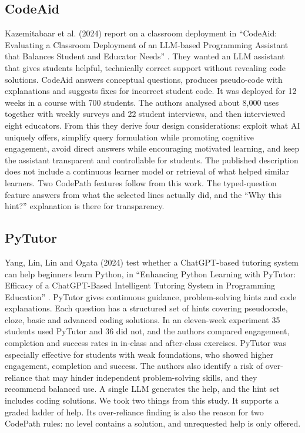 \clearpage
\subsection{CodeAid}
Kazemitabaar et al. (2024) report on a classroom deployment in ``CodeAid: Evaluating a Classroom Deployment of an LLM-based Programming Assistant that Balances Student and Educator Needs'' \cite{kazemitabaar2024}. They wanted an LLM assistant that gives students helpful, technically correct support without revealing code solutions. CodeAid answers conceptual questions, produces pseudo-code with explanations and suggests fixes for incorrect student code. It was deployed for 12 weeks in a course with 700 students. The authors analysed about 8,000 uses together with weekly surveys and 22 student interviews, and then interviewed eight educators. From this they derive four design considerations: exploit what AI uniquely offers, simplify query formulation while promoting cognitive engagement, avoid direct answers while encouraging motivated learning, and keep the assistant transparent and controllable for students. The published description does not include a continuous learner model or retrieval of what helped similar learners. Two CodePath features follow from this work. The typed-question feature answers from what the selected lines actually did, and the ``Why this hint?'' explanation is there for transparency.

\subsection{PyTutor}
Yang, Lin, Lin and Ogata (2024) test whether a ChatGPT-based tutoring system can help beginners learn Python, in ``Enhancing Python Learning with PyTutor: Efficacy of a ChatGPT-Based Intelligent Tutoring System in Programming Education'' \cite{yang2024}. PyTutor gives continuous guidance, problem-solving hints and code explanations. Each question has a structured set of hints covering pseudocode, cloze, basic and advanced coding solutions. In an eleven-week experiment 35 students used PyTutor and 36 did not, and the authors compared engagement, completion and success rates in in-class and after-class exercises. PyTutor was especially effective for students with weak foundations, who showed higher engagement, completion and success. The authors also identify a risk of over-reliance that may hinder independent problem-solving skills, and they recommend balanced use. A single LLM generates the help, and the hint set includes coding solutions. We took two things from this study. It supports a graded ladder of help. Its over-reliance finding is also the reason for two CodePath rules: no level contains a solution, and unrequested help is only offered.

